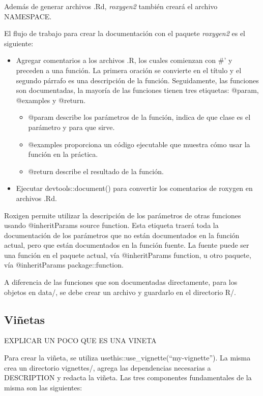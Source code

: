 Además de generar archivos .Rd, \emph{roxygen2} también creará el archivo NAMESPACE.

El flujo de trabajo para crear la documentación con el paquete \emph{roxygen2} es el siguiente:
\begin{itemize}
\item Agregar comentarios a los archivos .R, los cuales comienzan con \#' y preceden a una función. La primera oración se convierte en el título y el segundo párrafo es una descripción de la función. Seguidamente, las funciones son documentadas, la mayoría de las funciones tienen tres etiquetas: @param, @examples y @return.

\begin{itemize}
\item  @param describe los parámetros de la función, indica de que clase es el parámetro y para que sirve.
\item @examples proporciona un código ejecutable que muestra cómo usar la función en la práctica. 
\item @return describe el resultado de la función. 
\end{itemize}
\end{itemize}
\begin{itemize}

\item Ejecutar devtools::document() para convertir los comentarios de roxygen en archivos .Rd. 

\end{itemize}

Roxigen permite utilizar la descripción de los parámetros de otras funciones usando @inheritParams source function. Esta etiqueta traerá toda la documentación de los parámetros que no están documentados en la función actual, pero que están documentados en la función fuente. La fuente puede ser una función en el paquete actual, vía @inheritParams function, u otro paquete, vía @inheritParams package::function.

A diferencia de las funciones que son documentadas directamente, para los objetos en data/, se debe crear un archivo y guardarlo en el directorio R/.



\subsection{Viñetas}

EXPLICAR UN POCO QUE ES UNA VINETA


Para crear la viñeta, se utiliza usethis::use\_vignette(``my-vignette''). La misma crea un directorio vignettes/, agrega las dependencias necesarias a DESCRIPTION y redacta la viñeta. Las tres componentes fundamentales de la misma son las siguientes:

